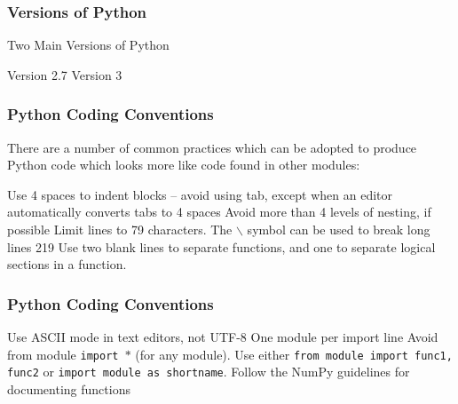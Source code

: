 \documentclass[MASTER.tex]{subfiles}
\begin{document}
 
 
 
 \frametitle{Versions of Python}
  
 Two Main Versions of Python
  
   Version 2.7
   Version 3
  
 
 
 
\frametitle{Python Coding Conventions}
 
There are a number of common practices which can be adopted to produce Python code which looks
more like code found in other modules:
 
  Use 4 spaces to indent blocks – avoid using tab, except when an editor automatically converts tabs
 to 4 spaces
  Avoid more than 4 levels of nesting, if possible
  Limit lines to 79 characters. The $\backslash$ symbol can be used to break long lines
 219
  Use two blank lines to separate functions, and one to separate logical sections in a function.
 
 
 
 
\frametitle{Python Coding Conventions}
 
  
  Use ASCII mode in text editors, not UTF-8
  One module per import line
  Avoid from module \texttt{import $\ast$} (for any module). Use either \texttt{from module import func1, func2} or
 \texttt{import module as shortname}.
  Follow the NumPy guidelines for documenting functions
 

 
\end{document}
